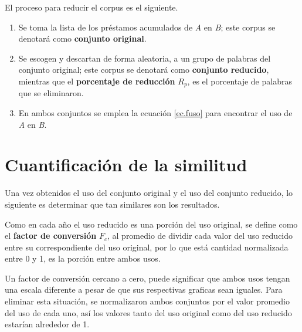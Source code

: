 El proceso para reducir el corpus es el siguiente. 

\begin{enumerate}
	
	\item Se toma la lista de los préstamos acumulados de \textit{A} en \textit{B}; este corpus se denotará como \textbf{conjunto original}.
	
	\item Se escogen y descartan de forma aleatoria, a un grupo de palabras del conjunto original; este corpus  se denotará como \textbf{conjunto reducido}, mientras que el \textbf{porcentaje de reducción} $R_{p}$, es el porcentaje de palabras que se eliminaron.
	
	
	
	\item En ambos conjuntos se emplea la ecuación \ref{ec.fuso} para encontrar el uso de \textit{A} en \textit{B}. %
	
\end{enumerate}

\section{Cuantificación de la similitud}

Una vez obtenidos el uso del conjunto original y el uso del conjunto reducido, lo siguiente es determinar que tan similares son los resultados.

Como en cada año el uso reducido es una porción del uso original, se define como el \textbf{factor de conversión} $F_{c}$, al promedio de dividir cada valor del uso reducido entre su correspondiente del uso original, por lo que está cantidad normalizada entre 0 y 1, es la porción entre ambos usos. 

Un factor de conversión cercano a cero, puede significar que ambos usos tengan una escala diferente a pesar de que sus respectivas graficas sean iguales. Para eliminar esta situación, se normalizaron ambos conjuntos por el valor promedio del uso de cada uno,  así los valores tanto del uso original como del uso reducido estarían alrededor de 1.  

